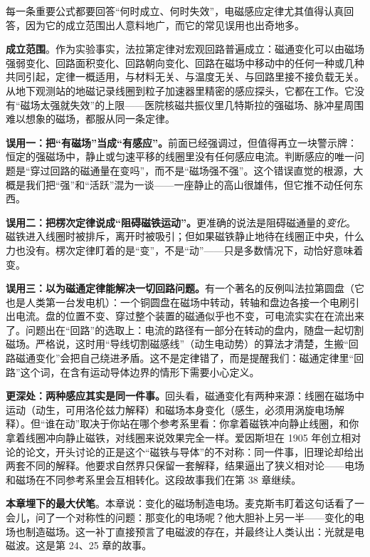 
每一条重要公式都要回答“何时成立、何时失效”，电磁感应定律尤其值得认真回答，因为它的成立范围出人意料地广，而它的常见误用也出奇地多。

\textbf{成立范围}。作为实验事实，法拉第定律对宏观回路普遍成立：磁通变化可以由磁场强弱变化、回路面积变化、回路朝向变化、回路在磁场中移动中的任何一种或几种共同引起，定律一概适用，与材料无关、与温度无关、与回路里接不接负载无关。从地下观测站的地磁记录线圈到粒子加速器里精密的感应探头，它都在工作。它没有“磁场太强就失效”的上限——医院核磁共振仪里几特斯拉的强磁场、脉冲星周围难以想象的磁场，都服从同一条定律。

\textbf{误用一：把“有磁场”当成“有感应”。}前面已经强调过，但值得再立一块警示牌：恒定的强磁场中，静止或匀速平移的线圈里没有任何感应电流。判断感应的唯一问题是“穿过回路的磁通量在变吗”，而不是“磁场强不强”。这个错误直觉的根源，大概是我们把“强”和“活跃”混为一谈——一座静止的高山很雄伟，但它推不动任何东西。

\textbf{误用二：把楞次定律说成“阻碍磁铁运动”。}更准确的说法是阻碍磁通量的\emph{变化}。磁铁进入线圈时被排斥，离开时被吸引；但如果磁铁静止地待在线圈正中央，什么力也没有。楞次定律盯着的是“变”，不是“动”——只是多数情况下，动恰好意味着变。

\textbf{误用三：以为磁通定律能解决一切回路问题。}有一个著名的反例叫法拉第圆盘（它也是人类第一台发电机）：一个铜圆盘在磁场中转动，转轴和盘边各接一个电刷引出电流。盘的位置不变、穿过整个装置的磁通似乎也不变，可电流实实在在流出来了。问题出在“回路”的选取上：电流的路径有一部分在转动的盘内，随盘一起切割磁场。严格说，这时用“导线切割磁感线”（动生电动势）的算法才清楚，生搬“回路磁通变化”会把自己绕进矛盾。这不是定律错了，而是提醒我们：磁通定律里“回路”这个词，在含有运动导体边界的情形下需要小心定义。

\textbf{更深处：两种感应其实是同一件事。}回头看，磁通变化有两种来源：线圈在磁场中运动（动生，可用洛伦兹力解释）和磁场本身变化（感生，必须用涡旋电场解释）。但“谁在动”取决于你站在哪个参考系里看：你拿着磁铁冲向静止线圈，和你拿着线圈冲向静止磁铁，对线圈来说效果完全一样。爱因斯坦在 1905 年创立相对论的论文，开头讨论的正是这个“磁铁与导体”的不对称：同一件事，旧理论却给出两套不同的解释。他要求自然界只保留一套解释，结果逼出了狭义相对论——电场和磁场在不同参考系里会互相转化。这段故事我们在第 38 章继续。

\textbf{本章埋下的最大伏笔}。本章说：变化的磁场制造电场。麦克斯韦盯着这句话看了一会儿，问了一个对称性的问题：那变化的电场呢？他大胆补上另一半——变化的电场也制造磁场。这一补丁直接预言了电磁波的存在，并最终让人类认出：光就是电磁波。这是第 24、25 章的故事。

